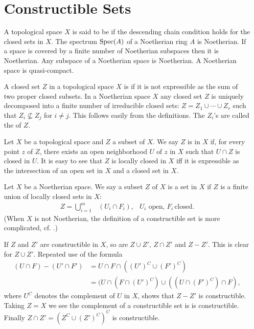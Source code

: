 \documentclass[../main]{subfiles}
\begin{document}

\section{Constructible Sets}\label{sec:06}

\newparagraph A topological space $X$ is said to be  if the descending chain condition holds for the closed sets in $X$. The spectrum $\operatorname{Spec}(A)$ of a Noetherian ring $A$ is Noetherian. If a space is covered by a finite number of Noetherian subspaces then it is Noetherian. Any subspace of a Noetherian space is Noetherian. A Noetherian space is quasi-compact.

A closed set $Z$ in a topological space $X$ is  if it is not expressible as the sum of two proper closed subsets. In a Noetherian space $X$ any closed set $Z$ is uniquely decomposed into a finite number of irreducible closed sets: $Z = Z_1 \cup \cdots \cup Z_r$ such that $Z_i \not\subseteq Z_j$ for $i \ne j$. This follows easily from the definitions. The $Z_i$'s are called the  of $Z$. 

\newparagraph Let $X$ be a topological space and $Z$ a subset of $X$. We say $Z$ is  in $X$ if, for every point $z$ of $Z$, there exists an open neighborhood $U$ of $z$ in $X$ such that $U \cap Z$ is closed in $U$. It is easy to see that $Z$ is locally closed in $X$ iff it is expressible as the intersection of an open set in $X$ and a closed set in $X$.

Let $X$ be a Noetherian space. We say a subset $Z$ of $X$ is a  set in $X$ if $Z$ is a finite union of locally closed sets in $X$:
\[
\begin{aligned}
Z = \bigcup_{i=1} ^m &(U_i \cap F_i), &U_i \text{ open, } F_i\, \text{closed.}
\end{aligned}
\]
(When $X$ is not Noetherian, the definition of a constructible set is more complicated, cf. \cite{egaIII1}.)

If $Z$ and $Z'$ are constructible in $X$, so are $Z\cup Z'$, $Z\cap Z'$ and $Z - Z'$. This is clear for $Z \cup Z'$. Repeated use of the formula
\begin{align*}
(U \cap F) - (U' \cap F') 
&= U \cap F \cap ((U')^C \cup (F')^C)\\
&= (U \cap (F \cap (U')^C) \cup ((U \cap (F')^C) \cap F),
\end{align*}
where $U^C$ denotes the complement of $U$ in $X$, shows that $Z- Z'$ is constructible. Taking $Z=X$ we see the complement of a constructible set is is constructible. Finally $Z \cap Z' = (Z^C \cup (Z')^C)^C$ is constructible.
\end{document}
